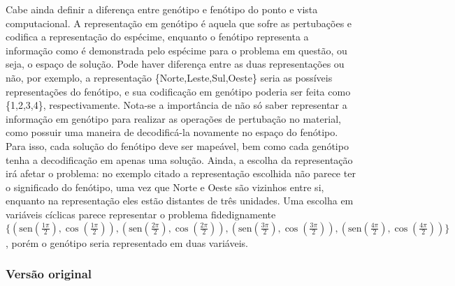 Cabe ainda definir a diferença entre genótipo e fenótipo do ponto e
vista computacional. A representação em genótipo é aquela que sofre as
pertubações e codifica a representação do espécime, enquanto o
fenótipo representa a informação como é demonstrada pelo espécime para
o problema em questão, ou seja, o espaço de solução. Pode haver
diferença entre as duas representações ou não, por exemplo, a
representação \{Norte,Leste,Sul,Oeste\} seria as possíveis
representações do fenótipo, e sua codificação em genótipo poderia ser
feita como \{1,2,3,4\}, respectivamente. Nota-se a importância de não
só saber representar a informação em genótipo para realizar as
operações de pertubação no material, como possuir uma maneira de
decodificá-la novamente no espaço do fenótipo. Para isso, cada solução
do fenótipo deve ser mapeável, bem como cada genótipo tenha a
decodificação em apenas uma solução. Ainda, a escolha da representação
irá afetar o problema: no exemplo citado a representação escolhida
não parece ter o significado do fenótipo, uma vez que Norte e Oeste são
vizinhos entre si, enquanto na representação eles estão distantes de três
unidades. Uma escolha em variáveis cíclicas parece representar o
problema fidedignamente
$\{(\text{sen}(\frac{1\pi}{2}),\cos(\frac{1\pi}{2})),
(\text{sen}(\frac{2\pi}{2}),\cos(\frac{2\pi}{2})),
(\text{sen}(\frac{3\pi}{2}),\cos(\frac{3\pi}{2})),
(\text{sen}(\frac{4\pi}{2}),\cos(\frac{4\pi}{2}))\}$, porém o genótipo
seria representado em duas variáveis.

\subsubsection{Versão original}

